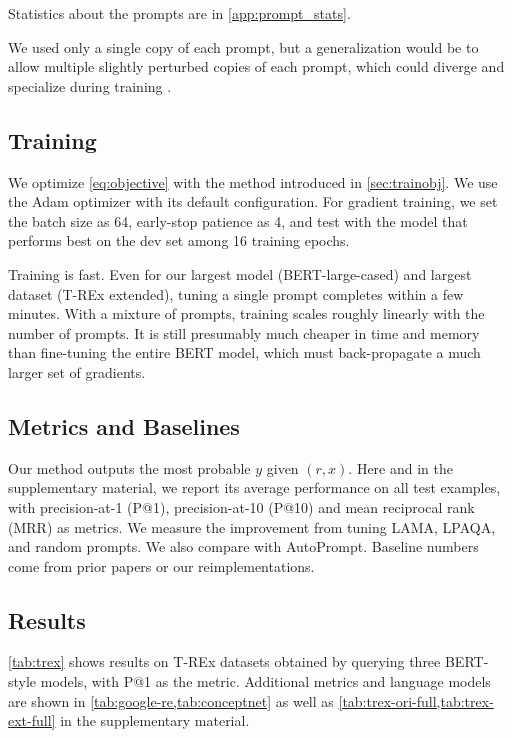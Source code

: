 Statistics about the prompts are in \ref{app:prompt_stats}.

We used only a single copy of each prompt, but a generalization would be to allow multiple slightly perturbed copies of each prompt, which could diverge and specialize during training \cite{rose-1998}.

\subsection{Training}

We optimize \ref{eq:objective} with the method introduced in \ref{sec:trainobj}.
We use the Adam optimizer \citep{kingmaAdamMethodStochastic2015} with its default configuration. For gradient training, we set the batch size as 64, early-stop patience as 4, and test with the model that performs best on the dev set among 16 training epochs.

Training is fast.  Even for our largest model (BERT-large-cased) and largest dataset (T-REx extended), tuning a single prompt completes within a few minutes.  With a mixture of prompts, training scales roughly linearly with the number of prompts.  It is still presumably much cheaper in time and memory than fine-tuning the entire BERT model, which must back-propagate a much larger set of gradients.

\subsection{Metrics and Baselines}

Our method outputs the most probable $y$ given $(r,x)$.  Here and in the supplementary material, we report its average performance on all test examples, with precision-at-1 (P@1), precision-at-10 (P@10) and mean reciprocal rank (MRR) as metrics.  We measure the improvement from tuning LAMA, LPAQA, and random prompts.  We also compare with AutoPrompt. Baseline numbers come from prior papers or our reimplementations.

\subsection{Results}

\ref{tab:trex} shows results on T-REx datasets obtained by querying three BERT-style models, with P@1 as the metric.  Additional metrics and language models are shown in \ref{tab:google-re,tab:conceptnet} as well as \ref{tab:trex-ori-full,tab:trex-ext-full} in the supplementary material.  


